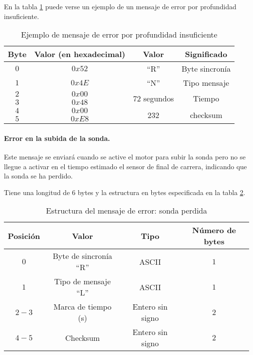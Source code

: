 En la tabla \ref{tab17} puede verse un ejemplo de un mensaje de error por profundidad insuficiente.

\begin{table}[h]
	\centering
	\caption{Ejemplo de mensaje de error por profundidad insuficiente}
	\begin{tabular}{|c|c|c|c|}\hline
		\textbf{Byte} 	&	\textbf{Valor (en hexadecimal)}	&\textbf{Valor}	&\textbf{Significado} \\ \hline \hline
		$0$ 			&  $0x52$			& ``R''		& Byte sincronía	\\ \hline
		$1$				&  $0x4E$			& ``N''		& Tipo mensaje		\\ \hline
		$2$				&  $0x00$			& \multirow{2}{*}{$72$ segundos} & \multirow{2}{*}{Tiempo} \\
		$3$				&  $0x48$			&  & \\ \hline	
		$4$				&  $0x00$			&  \multirow{2}{*}{232}	& \multirow{2}{*}{checksum} \\
		$5$				&  $0xE8$			&     &     \\ \hline	
		
		
	\end{tabular}
	\label{tab17}
\end{table}

\paragraph{Error en la subida de la sonda.} Este mensaje se enviará cuando se active el motor para subir la sonda pero no se llegue a activar en el tiempo estimado el sensor de final de carrera, indicando que la sonda se ha perdido. 

Tiene una longitud de $6$ bytes y la estructura en bytes especificada en la tabla \ref{tab18}.

\begin{table}[h]
	\centering
	\caption{Estructura del mensaje de error: sonda perdida}
	\begin{tabular}{|c|c|c|c|}\hline 
		\textbf{Posición}	& \textbf{Valor} & \textbf{Tipo} &\textbf{Número de bytes} \\ \hline \hline 
		$0$		& Byte de sincronía ``R''				& ASCII	 			&	$1$ \\  \hline
		$1$		& Tipo de mensaje ``L''					& ASCII	 			&	$1$ \\  \hline
		$2-3$	& Marca de tiempo (s)					& Entero sin signo	&   $2$ \\  \hline
		$4-5$	& Checksum 				  				& Entero sin signo	&   $2$ \\  \hline
	\end{tabular}
	\label{tab18}
\end{table}

